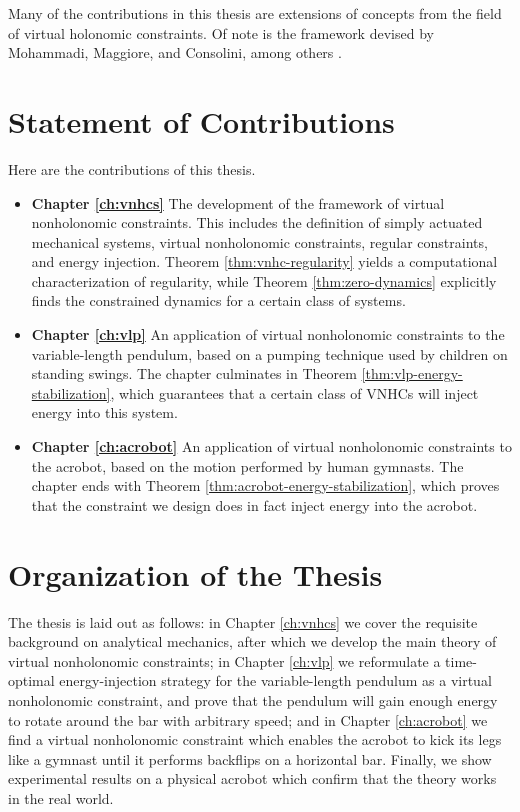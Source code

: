 Many of the contributions in this thesis are extensions of concepts from the
field of virtual holonomic constraints. 
Of note is the framework devised by Mohammadi, Maggiore, and
Consolini, among others
\cite{vhcs_for_el_systems,dynamic_vhcs_stabilize_closed_orbits,lagrangian_structure_reduced_dynamics_vhcs,xingbo_thesis}.

\section{Statement of Contributions}
Here are the contributions of this thesis.
\begin{itemize}[label={}]
   \item \textbf{Chapter \ref{ch:vnhcs}} The development of the framework of
      virtual nonholonomic constraints.
      This includes the definition of simply actuated mechanical systems, virtual
      nonholonomic constraints, regular constraints, and energy injection.
      Theorem \ref{thm:vnhc-regularity} yields a computational characterization
      of regularity, while Theorem \ref{thm:zero-dynamics} explicitly finds the
      constrained dynamics for a certain class of systems.
   \item \textbf{Chapter \ref{ch:vlp}} An application of virtual nonholonomic
      constraints to the variable-length pendulum, based on a pumping technique
      used by children on standing swings.
      The chapter culminates in Theorem \ref{thm:vlp-energy-stabilization},
      which guarantees that a certain class of VNHCs will inject energy into
      this system.
   \item \textbf{Chapter \ref{ch:acrobot}} An application of virtual
      nonholonomic constraints to the acrobot, based on the motion performed by
      human gymnasts.
      The chapter ends with Theorem \ref{thm:acrobot-energy-stabilization},
      which proves that the constraint we design does in fact inject energy into
      the acrobot.
\end{itemize}

\section{Organization of the Thesis}
The thesis is laid out as follows: 
in Chapter \ref{ch:vnhcs} we cover the requisite background on analytical 
mechanics, after which we develop the main theory of virtual nonholonomic
constraints;
in Chapter \ref{ch:vlp} we reformulate a time-optimal energy-injection strategy
for the variable-length pendulum as a virtual nonholonomic constraint, and
prove that the pendulum will gain enough energy to rotate around the bar with
arbitrary speed;
and in Chapter \ref{ch:acrobot} we find a virtual nonholonomic constraint 
which enables the acrobot to kick its legs like a gymnast until it
performs backflips on a horizontal bar.
Finally, we show experimental results on a physical acrobot which confirm
that the theory works in the real world.

